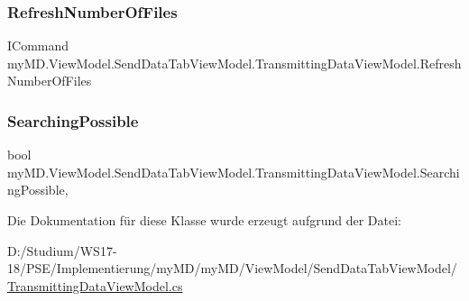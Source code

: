 \subsubsection{\texorpdfstring{Refresh\+Number\+Of\+Files}{RefreshNumberOfFiles}}
{\footnotesize\ttfamily I\+Command my\+M\+D.\+View\+Model.\+Send\+Data\+Tab\+View\+Model.\+Transmitting\+Data\+View\+Model.\+Refresh\+Number\+Of\+Files\hspace{0.3cm}{\ttfamily [get]}}

\mbox{\label{classmy_m_d_1_1_view_model_1_1_send_data_tab_view_model_1_1_transmitting_data_view_model_a303ab750ac74c934f8c02b392702a2fa}} 
\subsubsection{\texorpdfstring{Searching\+Possible}{SearchingPossible}}
{\footnotesize\ttfamily bool my\+M\+D.\+View\+Model.\+Send\+Data\+Tab\+View\+Model.\+Transmitting\+Data\+View\+Model.\+Searching\+Possible\hspace{0.3cm}{\ttfamily [get]}, {\ttfamily [set]}}



Die Dokumentation für diese Klasse wurde erzeugt aufgrund der Datei\+:\begin{DoxyCompactItemize}
\item 
D\+:/\+Studium/\+W\+S17-\/18/\+P\+S\+E/\+Implementierung/my\+M\+D/my\+M\+D/\+View\+Model/\+Send\+Data\+Tab\+View\+Model/\mbox{\hyperlink{_transmitting_data_view_model_8cs}{Transmitting\+Data\+View\+Model.\+cs}}\end{DoxyCompactItemize}
